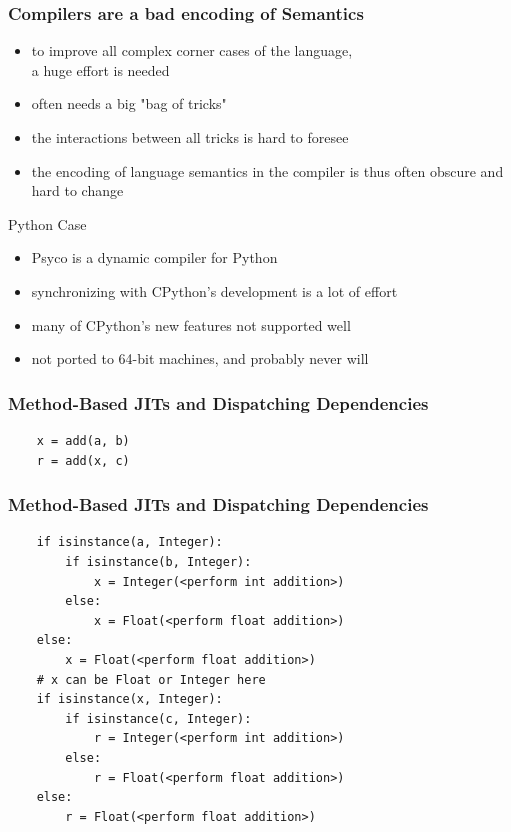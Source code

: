 \documentclass[utf8x]{beamer}
\begin{document}
\begin{frame}
  \frametitle{Compilers are a bad encoding of Semantics}
  \begin{itemize}
  \item to improve all complex corner cases of the language, \\
  a huge effort is needed
  \item often needs a big "bag of tricks"
  \item the interactions between all tricks is hard to foresee
  \item the encoding of language semantics in the compiler is thus often obscure and hard to change
  \end{itemize}
  \pause
  \begin{block}{
    Python Case}
    \begin{itemize}
    \item Psyco is a dynamic compiler for Python
    \item synchronizing with CPython's development is a lot of effort
    \item many of CPython's new features not supported well
    \item not ported to 64-bit machines, and probably never will
    \end{itemize}
  \end{block}
\end{frame}

\begin{frame}[containsverbatim]
  \frametitle{Method-Based JITs and Dispatching Dependencies}
\begin{verbatim}
    x = add(a, b)
    r = add(x, c)
\end{verbatim}
\end{frame}

\begin{frame}
  \frametitle{Method-Based JITs and Dispatching Dependencies}
\begin{verbatim}
    if isinstance(a, Integer):
        if isinstance(b, Integer):
            x = Integer(<perform int addition>)
        else:
            x = Float(<perform float addition>)
    else:
        x = Float(<perform float addition>)
    # x can be Float or Integer here
    if isinstance(x, Integer):
        if isinstance(c, Integer):
            r = Integer(<perform int addition>)
        else:
            r = Float(<perform float addition>)
    else:
        r = Float(<perform float addition>)
\end{verbatim}
\end{frame}
\end{document}
